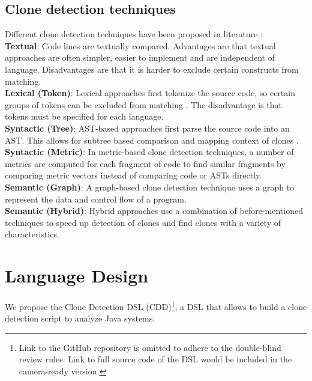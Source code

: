 \documentclass[sigplan,10pt,review,anonymous]{acmart}
\begin{document}
\subsection{Clone detection techniques}
Different clone detection techniques have been proposed in literature \cite{sheneamer2016survey}:
\\ \textbf{Textual}: Code lines are textually compared. Advantages are that textual approaches are often simpler, easier to implement and are independent of language. Disadvantages are that it is harder to exclude certain constructs from matching.
\\ \textbf{Lexical (Token)}: Lexical approaches first tokenize the source code, so certain groups of tokens can be excluded from matching \cite{svajlenko2014evaluating}. The disadvantage is that tokens must be specified for each language.
\\ \textbf{Syntactic (Tree)}: AST-based approaches first parse the source code into an AST. This allows for subtree based comparison and mapping context of clones \cite{fontana2015duplicated}.
\\ \textbf{Syntactic (Metric)}: In metric-based clone detection techniques, a number of metrics are computed for each fragment of code to find similar fragments by comparing metric vectors instead of comparing code or ASTs directly.
\\ \textbf{Semantic (Graph)}: A graph-based clone detection technique uses a graph to represent the data and control flow of a program.
\\ \textbf{Semantic (Hybrid)}: Hybrid approaches use a combination of before-mentioned techniques to speed up detection of clones and find clones with a variety of characteristics.


\section{Language Design}
We propose the Clone Detection DSL (CDD)\footnote{Link to the GitHub repository is omitted to adhere to the double-blind review rules. Link to full source code of the DSL would be included in the camera-ready version.}, a DSL that allows to build a clone detection script to analyze Java systems.
\end{document}
